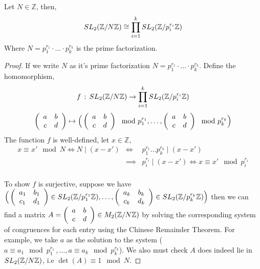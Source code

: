 \begin{proposition} \label{prop:chineseRemainderTheorem}
Let $N\in \mathbb{Z}$, then, 
$$ \sltznz \cong \prod_{i=1}^k \sltznz[p_{i}^{r_i}]$$
Where $N = p_{1}^{r_1}\cdot\dots\cdot p_{k}^{r_k}$ is the prime factorization.
\end{proposition}
\begin{proof}
If we write $N$ as it's prime factorization $N = p_{1}^{r_1}
    \cdot\dots\cdot p_{k}^{r_k}$.
Define the homomorphism,
    $$f \, : \, \sltznz \to \prod_{i=1}^k \sltznz[p_{i}^{r_i}]$$
    $$\left(
      \begin{array}{ c c }
         a & b \\
         c & d
      \end{array} \right) \mapsto \Big( \left(
      \begin{array}{ c c }
         a & b \\
         c & d
      \end{array} \right) \mod p_{1}^{r_1} ,\dots, \left( \begin{array}{ c c }
         a & b \\
         c & d
      \end{array} \right) \mod p_{k}^{r_k} \Big)$$
      The function $f$ is well-defined, let $x\in \mathbb{Z}$, 
\begin{eqnarray*}
x \equiv x' \mod N \iff  N \mid (x-x') & \iff  & p_{1}^{r_1} \dots p_{k}^{r_k} \mid (x-x') \\
& \implies & p_i^{r_i} \mid (x-x') \iff x \equiv x' \mod  p_i^{r_i}
\end{eqnarray*}
\\
      To show $f$ is surjective, suppose we have  $\Big( \left(
      \begin{array}{ c c }
         a_1 & b_1 \\
         c_1 & d_1
      \end{array} \right) \in \sltznz[p_{1}^{r_1}],\dots, \left( \begin{array}{ c c }
         a_k & b_k \\
         c_k & d_k
      \end{array} \right) \in \sltznz[p_{k}^{r_k}]  \Big)$ 
      then we can find a matrix $A = \abcd \in M_2(\znz)$ by solving the corresponding system of congruences for each entry using the Chinese Remainder Theorem. For example, we take $a$ as the solution to the system \big($a \equiv a_1 \mod p_1^{r_1}\, ,\dots,a \equiv a_k \mod p_k^{r_k}$\big). We also must check $A$ does indeed lie in $\sltznz$, i.e $\det(A) \equiv 1 \mod N$. 

\end{proof}
